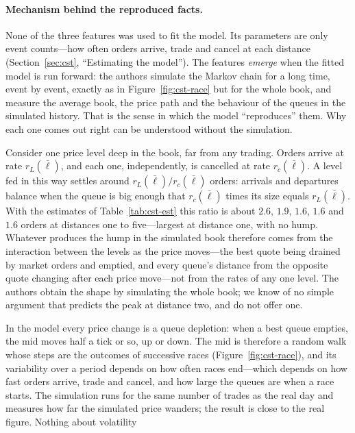 \paragraph{Mechanism behind the reproduced facts.} None of the three features was used to fit the model. Its
parameters are only event counts---how often orders arrive, trade and cancel at each distance
(Section~\ref{sec:cst}, ``Estimating the model''). The features \emph{emerge} when the fitted model is run
forward: the authors simulate the Markov chain for a long time, event by event, exactly as in
Figure~\ref{fig:cst-race} but for the whole book, and measure the average book, the price path and the
behaviour of the queues in the simulated history. That is the sense in which the model ``reproduces''
them. Why each one comes out right can be understood without the simulation.
\begin{description}[leftmargin=1.5em,style=nextline,itemsep=3pt]
\item[The hump] Consider one price level deep in the book, far from any trading. Orders arrive at rate
  $r_L(\bar\ell)$, and each one, independently, is cancelled at rate $r_c(\bar\ell)$. A level fed in this
  way settles around $r_L(\bar\ell)/r_c(\bar\ell)$ orders: arrivals and departures balance when the queue is
  big enough that $r_c(\bar\ell)$ times its size equals $r_L(\bar\ell)$. With the estimates of
  Table~\ref{tab:cst-est} this ratio is about $2.6$, $1.9$, $1.6$, $1.6$ and $1.6$ orders at distances one
  to five---largest at distance one, with no hump. Whatever produces the hump in the simulated book
  therefore comes from the interaction between the levels as the price moves---the best quote being
  drained by market orders and emptied, and every queue's distance from the opposite quote changing
  after each price move---not from the rates of any one level. The authors obtain the shape by
  simulating the whole book; we know of no simple argument that predicts the peak at distance two, and
  do not offer one.
\item[Volatility] In the model every price change is a queue depletion: when a best queue empties, the
  mid moves half a tick or so, up or down. The mid is therefore a random walk whose steps are the outcomes
  of successive races (Figure~\ref{fig:cst-race}), and its variability over a period depends on how often
  races end---which depends on how fast orders arrive, trade and cancel, and how large the queues are when
  a race starts. The simulation runs for the same number of trades as the real day and measures how far
  the simulated price wanders; the result is close to the real figure. Nothing about volatility

\end{description}
